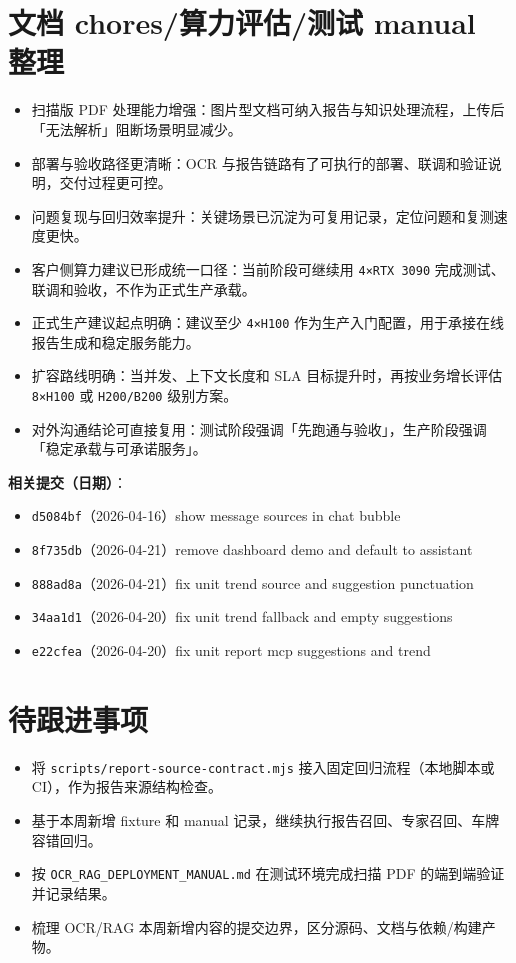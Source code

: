 \documentclass[UTF8]{ctexart}
\begin{document}
\section{文档 chores/算力评估/测试 manual 整理}

\begin{itemize}
\item 扫描版 PDF 处理能力增强：图片型文档可纳入报告与知识处理流程，上传后「无法解析」阻断场景明显减少。
\item 部署与验收路径更清晰：OCR 与报告链路有了可执行的部署、联调和验证说明，交付过程更可控。
\item 问题复现与回归效率提升：关键场景已沉淀为可复用记录，定位问题和复测速度更快。
\item 客户侧算力建议已形成统一口径：当前阶段可继续用 \texttt{4×RTX 3090} 完成测试、联调和验收，不作为正式生产承载。
\item 正式生产建议起点明确：建议至少 \texttt{4×H100} 作为生产入门配置，用于承接在线报告生成和稳定服务能力。
\item 扩容路线明确：当并发、上下文长度和 SLA 目标提升时，再按业务增长评估 \texttt{8×H100} 或 \texttt{H200/B200} 级别方案。
\item 对外沟通结论可直接复用：测试阶段强调「先跑通与验收」，生产阶段强调「稳定承载与可承诺服务」。
\end{itemize}

\textbf{相关提交（日期）}：
\begin{itemize}
\item \texttt{d5084bf}（2026-04-16）show message sources in chat bubble
\item \texttt{8f735db}（2026-04-21）remove dashboard demo and default to assistant
\item \texttt{888ad8a}（2026-04-21）fix unit trend source and suggestion punctuation
\item \texttt{34aa1d1}（2026-04-20）fix unit trend fallback and empty suggestions
\item \texttt{e22cfea}（2026-04-20）fix unit report mcp suggestions and trend
\end{itemize}

\section{待跟进事项}

\begin{itemize}
\item 将 \texttt{scripts/report-source-contract.mjs} 接入固定回归流程（本地脚本或 CI），作为报告来源结构检查。
\item 基于本周新增 fixture 和 manual 记录，继续执行报告召回、专家召回、车牌容错回归。
\item 按 \texttt{OCR\_RAG\_DEPLOYMENT\_MANUAL.md} 在测试环境完成扫描 PDF 的端到端验证并记录结果。
\item 梳理 OCR/RAG 本周新增内容的提交边界，区分源码、文档与依赖/构建产物。
\end{itemize}
\end{document}
